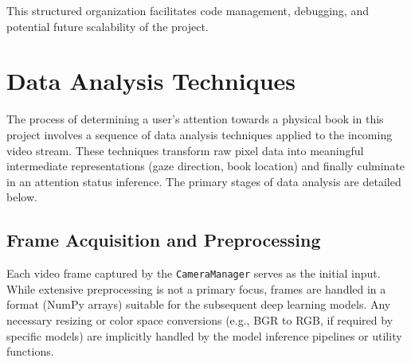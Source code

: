 This structured organization facilitates code management, debugging, and potential future scalability of the project.


\section{Data Analysis Techniques}
The process of determining a user's attention towards a physical book in this project involves a sequence of data analysis techniques applied to the incoming video stream. These techniques transform raw pixel data into meaningful intermediate representations (gaze direction, book location) and finally culminate in an attention status inference. The primary stages of data analysis are detailed below.

\subsection{Frame Acquisition and Preprocessing}
Each video frame captured by the \texttt{CameraManager} serves as the initial input. While extensive preprocessing is not a primary focus, frames are handled in a format (NumPy arrays) suitable for the subsequent deep learning models. Any necessary resizing or color space conversions (e.g., BGR to RGB, if required by specific models) are implicitly handled by the model inference pipelines or utility functions.


